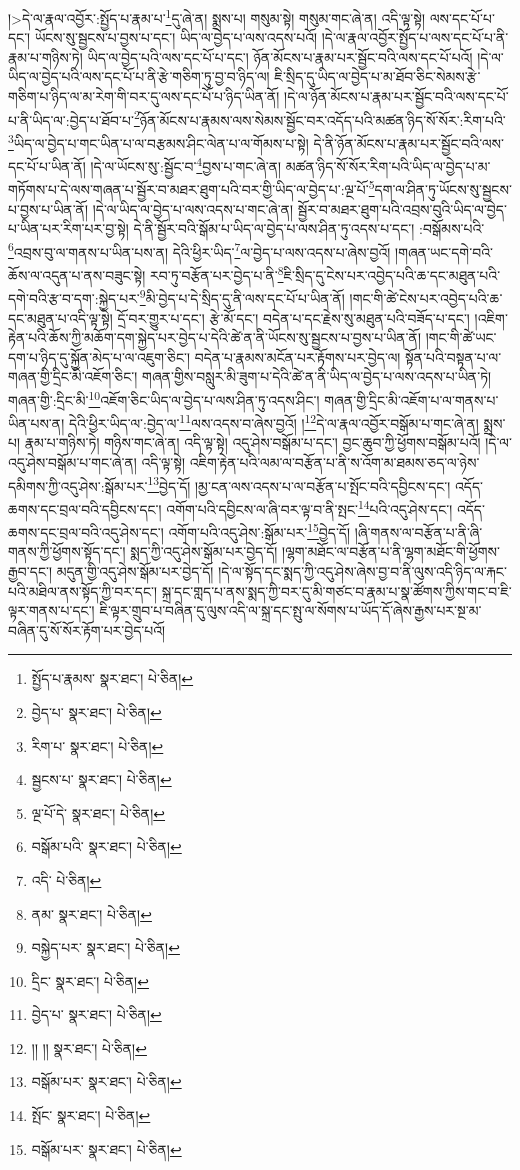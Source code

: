 །>དེ་ལ་རྣལ་འབྱོར་:སྤྱོད་པ་རྣམ་པ་\footnote{སྤྱོད་པ་རྣམས་  སྣར་ཐང་།  པེ་ཅིན། }དུ་ཞེ་ན། སྨྲས་པ། གསུམ་སྟེ། གསུམ་གང་ཞེ་ན། འདི་ལྟ་སྟེ། ལས་དང་པོ་པ་དང་། ཡོངས་སུ་སྦྱངས་པ་བྱས་པ་དང་། ཡིད་ལ་བྱེད་པ་ལས་འདས་པའོ། །དེ་ལ་རྣལ་འབྱོར་སྤྱོད་པ་ལས་དང་པོ་པ་ནི་རྣམ་པ་གཉིས་ཏེ། ཡིད་ལ་བྱེད་པའི་ལས་དང་པོ་པ་དང་། ཉོན་མོངས་པ་རྣམ་པར་སྦྱོང་བའི་ལས་དང་པོ་པའོ། །དེ་ལ་ཡིད་ལ་བྱེད་པའི་ལས་དང་པོ་པ་ནི་རྩེ་གཅིག་ཏུ་བྱ་བ་ཉིད་ལ། ཇི་སྲིད་དུ་ཡིད་ལ་བྱེད་པ་མ་ཐོབ་ཅིང་སེམས་རྩེ་གཅིག་པ་ཉིད་ལ་མ་རེག་གི་བར་དུ་ལས་དང་པོ་པ་ཉིད་ཡིན་ནོ། །དེ་ལ་ཉོན་མོངས་པ་རྣམ་པར་སྦྱོང་བའི་ལས་དང་པོ་པ་ནི་ཡིད་ལ་:བྱེད་པ་ཐོབ་པ་\footnote{བྱེད་པ་  སྣར་ཐང་།  པེ་ཅིན། }ཉོན་མོངས་པ་རྣམས་ལས་སེམས་སྦྱོང་བར་འདོད་པའི་མཚན་ཉིད་སོ་སོར་:རིག་པའི་\footnote{རིག་པ་  སྣར་ཐང་།  པེ་ཅིན། }ཡིད་ལ་བྱེད་པ་གང་ཡིན་པ་ལ་བརྩམས་ཤིང་ལེན་པ་ལ་གོམས་པ་སྟེ། དེ་ནི་ཉོན་མོངས་པ་རྣམ་པར་སྦྱོང་བའི་ལས་དང་པོ་པ་ཡིན་ནོ། །དེ་ལ་ཡོངས་སུ་:སྦྱོང་བ་\footnote{སྦྱངས་པ་  སྣར་ཐང་།  པེ་ཅིན། }བྱས་པ་གང་ཞེ་ན། མཚན་ཉིད་སོ་སོར་རིག་པའི་ཡིད་ལ་བྱེད་པ་མ་གཏོགས་པ་དེ་ལས་གཞན་པ་སྦྱོར་བ་མཐར་ཐུག་པའི་བར་གྱི་ཡིད་ལ་བྱེད་པ་:ལྔ་པོ་\footnote{ལྔ་པོ་དེ་  སྣར་ཐང་།  པེ་ཅིན། }དག་ལ་ཤིན་ཏུ་ཡོངས་སུ་སྦྱངས་པ་བྱས་པ་ཡིན་ནོ། །དེ་ལ་ཡིད་ལ་བྱེད་པ་ལས་འདས་པ་གང་ཞེ་ན། སྦྱོར་བ་མཐར་ཐུག་པའི་འབྲས་བུའི་ཡིད་ལ་བྱེད་པ་ཡིན་པར་རིག་པར་བྱ་སྟེ། དེ་ནི་སྦྱོར་བའི་སྒོམ་པ་ཡིད་ལ་བྱེད་པ་ལས་ཤིན་ཏུ་འདས་པ་དང་། :བསྒོམས་པའི་\footnote{བསྒོམ་པའི་  སྣར་ཐང་།  པེ་ཅིན། }འབྲས་བུ་ལ་གནས་པ་ཡིན་པས་ན། དེའི་ཕྱིར་ཡིད་\footnote{འདི་  པེ་ཅིན། }ལ་བྱེད་པ་ལས་འདས་པ་ཞེས་བྱའོ། །གཞན་ཡང་དགེ་བའི་ཆོས་ལ་འདུན་པ་ནས་བཟུང་སྟེ། རབ་ཏུ་བརྩོན་པར་བྱེད་པ་ནི་\footnote{ནམ་  སྣར་ཐང་།  པེ་ཅིན། }ཇི་སྲིད་དུ་ངེས་པར་འབྱེད་པའི་ཆ་དང་མཐུན་པའི་དགེ་བའི་རྩ་བ་དག་:སྐྱེད་པར་\footnote{བསྐྱེད་པར་  སྣར་ཐང་།  པེ་ཅིན། }མི་བྱེད་པ་དེ་སྲིད་དུ་ནི་ལས་དང་པོ་པ་ཡིན་ནོ། །གང་གི་ཚེ་ངེས་པར་འབྱེད་པའི་ཆ་དང་མཐུན་པ་འདི་ལྟ་སྟེ། དྲོ་བར་གྱུར་པ་དང་། རྩེ་མོ་དང་། བདེན་པ་དང་རྗེས་སུ་མཐུན་པའི་བཟོད་པ་དང་། །འཇིག་རྟེན་པའི་ཆོས་ཀྱི་མཆོག་དག་སྐྱེད་པར་བྱེད་པ་དེའི་ཚེ་ན་ནི་ཡོངས་སུ་སྦྱངས་པ་བྱས་པ་ཡིན་ནོ། །གང་གི་ཚེ་ཡང་དག་པ་ཉིད་དུ་སྐྱོན་མེད་པ་ལ་འཇུག་ཅིང་། བདེན་པ་རྣམས་མངོན་པར་རྟོགས་པར་བྱེད་ལ། སྟོན་པའི་བསྟན་པ་ལ་གཞན་གྱི་དྲིང་མི་འཇོག་ཅིང་། གཞན་གྱིས་བསླུར་མི་ཟུག་པ་དེའི་ཚེ་ན་ནི་ཡིད་ལ་བྱེད་པ་ལས་འདས་པ་ཡིན་ཏེ། གཞན་གྱི་:དྲིང་མི་\footnote{དྲིང་  སྣར་ཐང་།  པེ་ཅིན། }འཇོག་ཅིང་ཡིད་ལ་བྱེད་པ་ལས་ཤིན་ཏུ་འདས་ཤིང་། གཞན་གྱི་དྲིང་མི་འཇོག་པ་ལ་གནས་པ་ཡིན་པས་ན། དེའི་ཕྱིར་ཡིད་ལ་:བྱེད་ལ་\footnote{བྱེད་པ་  སྣར་ཐང་།  པེ་ཅིན། }ལས་འདས་བ་ཞེས་བྱའོ། །\footnote{།། །།  སྣར་ཐང་།  པེ་ཅིན། }དེ་ལ་རྣལ་འབྱོར་བསྒོམ་པ་གང་ཞེ་ན། སྨྲས་པ། རྣམ་པ་གཉིས་ཏེ། གཉིས་གང་ཞེ་ན། འདི་ལྟ་སྟེ། འདུ་ཤེས་བསྒོམ་པ་དང་། བྱང་ཆུབ་ཀྱི་ཕྱོགས་བསྒོམ་པའོ། །དེ་ལ་འདུ་ཤེས་བསྒོམ་པ་གང་ཞེ་ན། འདི་ལྟ་སྟེ། འཇིག་རྟེན་པའི་ལམ་ལ་བརྩོན་པ་ནི་ས་འོག་མ་ཐམས་ཅད་ལ་ཉེས་དམིགས་ཀྱི་འདུ་ཤེས་:སྒོམ་པར་\footnote{བསྒོམ་པར་  སྣར་ཐང་།  པེ་ཅིན། }བྱེད་དོ། །མྱ་ངན་ལས་འདས་པ་ལ་བརྩོན་པ་སྤོང་བའི་དབྱིངས་དང་། འདོད་ཆགས་དང་བྲལ་བའི་དབྱིངས་དང་། འགོག་པའི་དབྱིངས་ལ་ཞི་བར་ལྟ་བ་ནི་སྤང་\footnote{སྤོང་  སྣར་ཐང་།  པེ་ཅིན། }པའི་འདུ་ཤེས་དང་། འདོད་ཆགས་དང་བྲལ་བའི་འདུ་ཤེས་དང་། འགོག་པའི་འདུ་ཤེས་:སྒོམ་པར་\footnote{བསྒོམ་པར་  སྣར་ཐང་།  པེ་ཅིན། }བྱེད་དོ། །ཞི་གནས་ལ་བརྩོན་པ་ནི་ཞི་གནས་ཀྱི་ཕྱོགས་སྟོད་དང་། སྨད་ཀྱི་འདུ་ཤེས་སྒོམ་པར་བྱེད་དོ། །ལྷག་མཐོང་ལ་བརྩོན་པ་ནི་ལྷག་མཐོང་གི་ཕྱོགས་རྒྱབ་དང་། མདུན་གྱི་འདུ་ཤེས་སྒོམ་པར་བྱེད་དོ། །དེ་ལ་སྟོད་དང་སྨད་ཀྱི་འདུ་ཤེས་ཞེས་བྱ་བ་ནི་ལུས་འདི་ཉིད་ལ་རྐང་པའི་མཐིལ་ནས་སྟོད་ཀྱི་བར་དང་། སྐྲ་དང་གླད་པ་ནས་སྨད་ཀྱི་བར་དུ་མི་གཙང་བ་རྣམ་པ་སྣ་ཚོགས་ཀྱིས་གང་བ་ཇི་ལྟར་གནས་པ་དང་། ཇི་ལྟར་གྲུབ་པ་བཞིན་དུ་ལུས་འདི་ལ་སྐྲ་དང་སྤུ་ལ་སོགས་པ་ཡོད་དོ་ཞེས་རྒྱས་པར་སྔ་མ་བཞིན་དུ་སོ་སོར་རྟོག་པར་བྱེད་པའོ། 